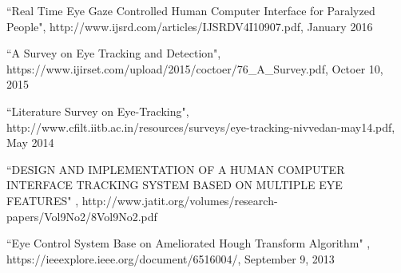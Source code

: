 \documentclass[12pt,singleside,a4paper]{article}
\begin{document}
\begin{thebibliography}{}

``Real Time Eye Gaze Controlled Human Computer  Interface for Paralyzed People", http://www.ijsrd.com/articles/IJSRDV4I10907.pdf, January 2016


``A Survey on Eye Tracking and Detection",\newline
https://www.ijirset.com/upload/2015/coctoer/76\_A\_Survey.pdf, Octoer 10, 2015


``Literature Survey on Eye-Tracking", http://www.cfilt.iitb.ac.in/resources/surveys/eye-tracking-nivvedan-may14.pdf, May 2014


``DESIGN AND IMPLEMENTATION OF A HUMAN COMPUTER INTERFACE TRACKING SYSTEM BASED ON MULTIPLE EYE FEATURES" , http://www.jatit.org/volumes/research-papers/Vol9No2/8Vol9No2.pdf


``Eye Control System Base on Ameliorated Hough Transform Algorithm" , https://ieeexplore.ieee.org/document/6516004/, September 9, 2013


\end{thebibliography}
\newpage


\end{document}
